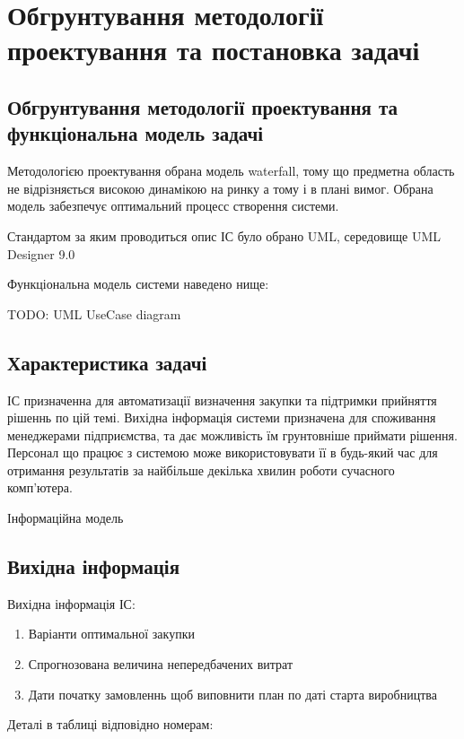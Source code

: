 \chapter{Обгрунтування методології проектування та постановка задачі}
\label{chap:second}

\section{Обгрунтування методології проектування та функціональна модель задачі}

Методологією проектування обрана модель waterfall, тому що предметна область не відрізняється високою динамікою на ринку а тому і в плані вимог. Обрана модель забезпечує оптимальний процесс створення системи.

Стандартом за яким проводиться опис ІС було обрано UML, середовище UML Designer 9.0

Функціональна модель системи наведено нище:

TODO: UML UseCase diagram

\section{Характеристика задачі}

ІС призначенна для автоматизації визначення закупки та підтримки прийняття рішеннь по цій темі. Вихідна інформація системи призначена для споживання менеджерами підприємства, та дає  можливість їм грунтовніше приймати рішення. Персонал що працює з системою може використовувати її в будь-який час для отримання результатів за найбільше декілька хвилин роботи сучасного комп'ютера.

Інформаційна модель

\section{Вихідна інформація}

Вихідна інформація ІС: 

\begin{enumerate}
	\item Варіанти оптимальної закупки
	\item Спрогнозована величина непередбачених витрат
	\item Дати початку замовленнь щоб виповнити план по даті старта виробництва
\end{enumerate}

Деталі в таблиці відповідно номерам:

